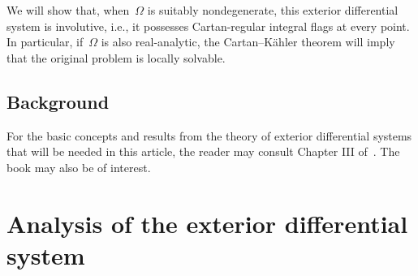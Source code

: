 \documentclass[11pt]{article}
\numberwithin{equation}{section}
\begin{document}
We will show that, when~$\Omega$ is suitably nondegenerate,
this exterior differential system is involutive, i.e.,
it possesses Cartan-regular integral flags at every point.
In particular, if~$\Omega$ is also real-analytic,
the Cartan--K\"ahler theorem will imply that the original problem
is locally solvable.

\subsection{Background}
For the basic concepts and results
from the theory of exterior differential systems
that will be needed in this article,
the reader may consult Chapter III of~\cite{BCGGG}. The book \cite{CFB} may also be of interest.

\section{Analysis of the exterior differential system}\label{EDS-sec}
\end{document}
